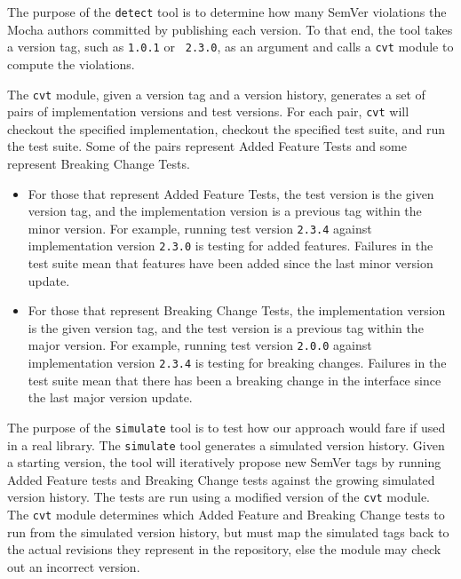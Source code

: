 The purpose of the {\tt detect} tool is to determine how many SemVer
violations the Mocha authors committed by publishing each version. To
that end, the tool takes a version tag, such as {\tt 1.0.1} or {\tt
  2.3.0}, as an argument and calls a {\tt cvt} module to compute the
violations.

The {\tt cvt} module, given a version tag and a version history,
generates a set of pairs of implementation versions and test
versions. For each pair, {\tt cvt} will checkout the specified
implementation, checkout the specified test suite, and run the test
suite. Some of the pairs represent Added Feature Tests and some
represent Breaking Change Tests.

\begin{itemize}
\item For those that represent Added Feature Tests, the test version
  is the given version tag, and the implementation version is a
  previous tag within the minor version. For example, running test
  version {\tt 2.3.4} against implementation version {\tt 2.3.0} is
  testing for added features. Failures in the test suite mean that
  features have been added since the last minor version update.
\item For those that represent Breaking Change Tests, the
  implementation version is the given version tag, and the test
  version is a previous tag within the major version. For example,
  running test version {\tt 2.0.0} against implementation version
  {\tt 2.3.4} is testing for breaking changes. Failures in the test
  suite mean that there has been a breaking change in the interface
  since the last major version update.
\end{itemize}

The purpose of the {\tt simulate} tool is to test how our approach
would fare if used in a real library. The {\tt simulate} tool
generates a simulated version history. Given a starting version, the
tool will iteratively propose new SemVer tags by running Added
Feature tests and Breaking Change tests against the growing simulated
version history. The tests are run using a modified version of the
{\tt cvt} module. The {\tt cvt} module determines which Added Feature
and Breaking Change tests to run from the simulated version history,
but must map the simulated tags back to the actual revisions they
represent in the repository, else the module may check out an
incorrect version.

